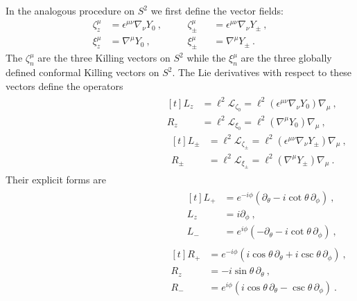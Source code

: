 \documentclass[12pt]{article}
\begin{document}
In the analogous procedure on $S^2$ we first define the vector fields:
\begin{equation}\begin{aligned}
	\zeta^\mu_z &= \epsilon^{\mu\nu} \nabla_\nu Y_0~, &&\quad \zeta^\mu_\pm &&= \epsilon^{\mu\nu} \nabla_\nu Y_\pm~,\\
	\xi^\mu_z &= \nabla^\mu Y_0~, &&\quad \xi^\mu_{\pm} &&= \nabla^\mu Y_{\pm}~.
\end{aligned}\end{equation}
The $\zeta^\mu_n$ are the three Killing vectors on $S^2$ while the $\xi^\mu_n$ are the three globally defined conformal Killing vectors on $S^2$.
The Lie derivatives with respect to these vectors define the operators
\begin{equation}
	\begin{split}\begin{aligned}[t]
		L_z &= \ell^2\mathcal{L}_{\zeta_0} = \ell^2(\epsilon^{\mu\nu} \nabla_\nu Y_0) \nabla_\mu~,\quad\\
		R_z &= \ell^2\mathcal{L}_{\xi_0} = \ell^2(\nabla^\mu Y_0) \nabla_\mu~,\quad 		
	\end{aligned}
	\begin{aligned}[t]
			L_\pm &= \ell^2\mathcal{L}_{\zeta_\pm} = \ell^2(\epsilon^{\mu\nu}\nabla_\nu Y_\pm)\nabla_\mu~,\\
			R_\pm &= \ell^2\mathcal{L}_{\xi_\pm} = \ell^2(\nabla^\mu Y_\pm)\nabla_\mu~.
	\end{aligned}\end{split}
\end{equation}
Their explicit forms are 
\begin{equation}
	\begin{split}\begin{aligned}[t]
		L_{+} &= e^{-i\phi}\left(\partial_\theta - i \cot\theta\,\partial_\phi\right)~, \quad \\
		L_{z} &= i \partial_\phi~, \quad \\
		L_{-} &= e^{i\phi}\left(-\partial_\theta - i \cot\theta\,\partial_\phi\right)~, \quad \\
	\end{aligned}
	\begin{aligned}[t]
		R_{+} &= e^{-i\phi}\left(i \cos\theta\,\partial_\theta + i \csc\theta\,\partial_\phi\right)~, \\
	R_{z} &= - i\sin\theta\, \partial_\theta~, \\
	R_{-} &= e^{i\phi}\left(i \cos\theta\,\partial_\theta - \csc\theta\,\partial_\phi\right)~.
	\end{aligned}\end{split}
\end{equation}
\end{document}
